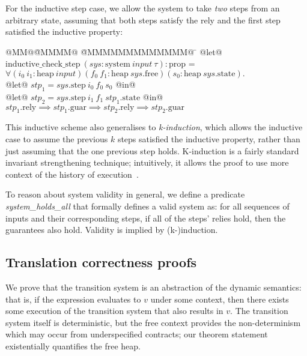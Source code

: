 For the inductive step case, we allow the system to take \emph{two} steps from an arbitrary state, assuming that both steps satisfy the rely and the first step satisfied the inductive property:
\begin{tabbing}
  @MM@\= @MMMM@ \= @MMMMMMMMMMMMM@ \= \kill
  @let@ $\text{inductive_check_step}~(\textit{sys}: \text{system}~\textit{input}~\tau): \text{prop}$ = \\
  \> $\forall (i_0~ i_1: \text{heap}~\textit{input}) (f_0~ f_1: \text{heap}~\textit{sys}\text{.free}) (s_0: \text{heap}~\textit{sys}\text{.state}).$ \\
  \> @let@ $\textit{stp}_1 = \textit{sys}\text{.step}~ i_0~ f_0~ s_0$ @in@ \\
  \> @let@ $\textit{stp}_2 = \textit{sys}\text{.step}~ i_1~ f_1~ \textit{stp}_1\text{.state}$ @in@ \\
  \> $\textit{stp}_1\text{.rely} \implies \textit{stp}_1\text{.guar} \implies \textit{stp}_2\text{.rely} \implies \textit{stp}_2\text{.guar}$
\end{tabbing}

This inductive scheme also generalises to \emph{k-induction}, which allows the inductive case to assume the previous $k$ steps satisfied the inductive property, rather than just assuming that the one previous step holds.
K-induction is a fairly standard invariant strengthening technique; intuitively, it allows the proof to use more context of the history of execution~\cite{hagen2008scaling,champion2016kind2,gacek2018jkind}.

To reason about system validity in general, we define a predicate \emph{system_holds_all} that formally defines a valid system as: for all sequences of inputs and their corresponding steps, if all of the steps' relies hold, then the guarantees also hold.
Validity is implied by (k-)induction.

\subsection{Translation correctness proofs}
\label{s:transition:proof}

We prove that the transition system is an abstraction of the dynamic semantics: that is, if the expression evaluates to $v$ under some context, then there exists some execution of the transition system that also results in $v$.
The transition system itself is deterministic, but the free context provides the non-determinism which may occur from underspecified contracts; our theorem statement existentially quantifies the free heap.

